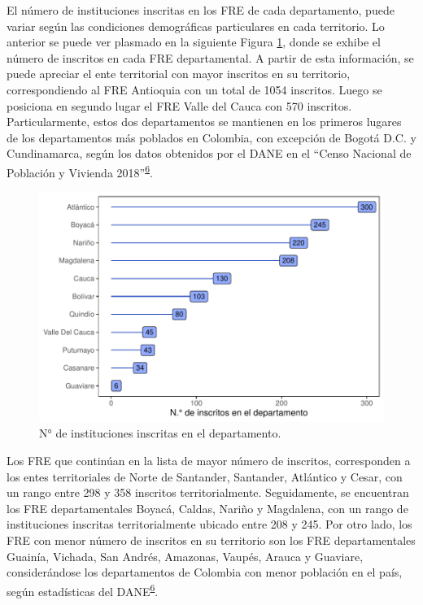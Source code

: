 \documentclass[
]{book}
\begin{document}
El número de instituciones inscritas en los FRE de cada departamento, puede variar según las condiciones demográficas particulares en cada territorio. Lo anterior se puede ver plasmado en la siguiente Figura \ref{fig:institucionesInscritas}, donde se exhibe el número de inscritos en cada FRE departamental. A partir de esta información, se puede apreciar el ente territorial con mayor inscritos en su territorio, correspondiendo al FRE Antioquia con un total de 1054 inscritos. Luego se posiciona en segundo lugar el FRE Valle del Cauca con 570 inscritos. Particularmente, estos dos departamentos se mantienen en los primeros lugares de los departamentos más poblados en Colombia, con excepción de Bogotá D.C. y Cundinamarca, según los datos obtenidos por el DANE en el ``Censo Nacional de Población y Vivienda 2018''\textsuperscript{\protect\hyperlink{ref-DANE2021}{6}}.

\begin{figure}[t]

{\centering \includegraphics[width=0.9\linewidth]{InformeFinal_files/figure-latex/institucionesInscritas-1} 

}

\caption{N° de instituciones inscritas en el departamento.}\label{fig:institucionesInscritas}
\end{figure}

Los FRE que continúan en la lista de mayor número de inscritos, corresponden a los entes territoriales de Norte de Santander, Santander, Atlántico y Cesar, con un rango entre 298 y 358 inscritos territorialmente. Seguidamente, se encuentran los FRE departamentales Boyacá, Caldas, Nariño y Magdalena, con un rango de instituciones inscritas territorialmente ubicado entre 208 y 245. Por otro lado, los FRE con menor número de inscritos en su territorio son los FRE departamentales Guainía, Vichada, San Andrés, Amazonas, Vaupés, Arauca y Guaviare, considerándose los departamentos de Colombia con menor población en el país, según estadísticas del DANE\textsuperscript{\protect\hyperlink{ref-DANE2021}{6}}.
\end{document}
